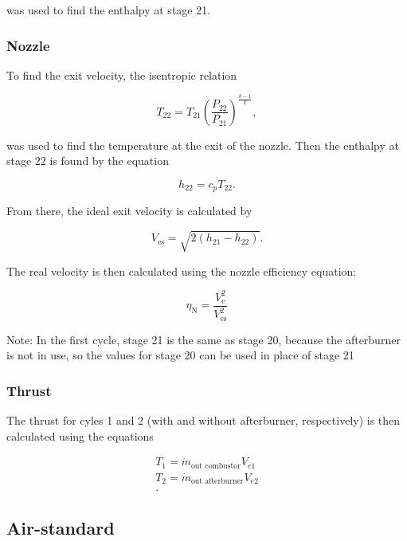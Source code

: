\documentclass[11pt]{article} %
\begin{document}
\noindent was used to find the enthalpy at stage 21.

\subsubsection*{Nozzle}
To find the exit velocity, the isentropic relation 

\begin{equation*}
T_{22} = T_{21}\left( \frac{P_{22}}{P_{21}} \right)^{ \frac{k-1}{k}},
\end{equation*}

\noindent was used to find the temperature at the exit of the nozzle. Then the enthalpy at stage 22 is found by the equation

\begin{equation*}
h_{22} = c_pT_{22}.
\end{equation*}

\noindent From there, the ideal exit velocity is calculated by

\begin{equation*}
V_{\text{es}} = \sqrt{2(h_{21} - h_{22})}.
\end{equation*}

\noindent The real velocity is then calculated using the nozzle efficiency equation:

\begin{equation*}
\eta_{\text{N}} = \frac{V_{\text{e}}^2}{V_{\text{es}}^2}
\end{equation*}

\noindent Note: In the first cycle, stage 21 is the same as stage 20, because the afterburner is not in use, so the values for stage 20 can be used in place of stage 21

\subsubsection*{Thrust}
The thrust for cyles 1 and 2 (with and without afterburner, respectively) is then calculated using the equations

\begin{align*}
T_{1} = \dot{m}_{\text{out combustor}}V_{e1}\\
T_{2} = \dot{m}_{\text{out afterburner}}V_{e2}\\.
\end{align*}

\subsection*{Air-standard}
\end{document}
